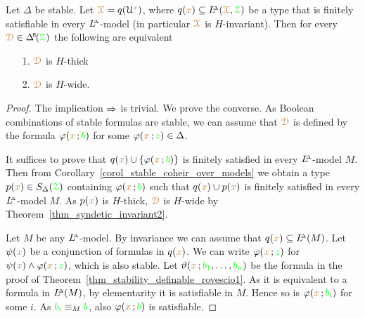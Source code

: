\begin{theorem}\label{thm_thick_finsat}
  Let $\Delta$ be stable.
  Let ${\color{brown}\EuScript X}=q(\EuScript U^{\color{brown} x})$, where $q({\color{brown} x})\subseteq L\kern-.5ex^{\scriptscriptstyle\Delta}({\color{brown}\EuScript X},{\color{green}\EuScript Z})$ be a type that is finitely satisfiable in every $L\kern-.5ex^{\scriptscriptstyle\Delta}$-model (in particular ${\color{brown}\EuScript X}$ is $H$-invariant).
  Then for every $\mrD\in\BDelta(\grZ)$ the following are equivalent 
  \begin{itemize}
    \item[1.] ${\color{brown}\EuScript D}$ is $H$-thick
    \item[2.] ${\color{brown}\EuScript D}$ is $H$-wide.
  \end{itemize}\smallskip
\end{theorem}
\begin{proof}
  The implication $\Rightarrow$ is trivial.
  We prove the converse.
  As Boolean combinations of stable formulas are stable, we can assume that ${\color{brown}\EuScript D}$ is defined by the formula $\varphi({\color{brown} x}\,;{\color{green} b})$ for some $\varphi({\color{brown} x}\,;{\color{green} z})\in\Delta$.

  It suffices to prove that $q({\color{brown} x})\cup\{\varphi({\color{brown} x}\,;{\color{green} b})\}$ is finitely satisfied in every $L\kern-.5ex^{\scriptscriptstyle\Delta}$-model $M$.
  Then from Corollary~\ref{corol_stable_coheir_over_models} we obtain a type $p({\color{brown} x})\in S_\Delta({\color{green}\EuScript Z})$ containing $\varphi({\color{brown} x}\,;{\color{green} b})$ such that $q({\color{brown} x})\cup p({\color{brown} x})$ is finitely  satisfied in every $L\kern-.5ex^{\scriptscriptstyle\Delta}$-model $M$. 
  As $p({\color{brown} x})$ is $H$-thick, ${\color{brown}\EuScript D}$ is $H$-wide by Theorem~\ref{thm_syndetic_invariant2}.
  
  Let $M$ be any  $L\kern-.5ex^{\scriptscriptstyle\Delta}$-model.
  By invariance we can assume that $q({\color{brown} x})\subseteq L\kern-.5ex^{\scriptscriptstyle\Delta}(M)$.
  Let $\psi({\color{brown} x})$ be a conjunction of formulas in $q({\color{brown} x})$.
  We can write $\varphi({\color{brown} x}\,;{\color{green} z})$ for $\psi({\color{brown} x})\wedge\varphi({\color{brown} x}\,;{\color{green} z})$, which is also stable.
  Let $\vartheta({\color{brown} x}\,;{\color{green} b_1},\dots,{\color{green} b_n})$ be the formula in the proof of Theorem~\ref{thm_stability_definable_rovescio1}.
  As it is equivalent to a formula in $L\kern-.5ex^{\scriptscriptstyle\Delta}(M)$, by elementarity it is satisfiable in $M$.
  Hence so is $\varphi({\color{brown} x}\,;{\color{green} b_i})$ for some $i$.
  As ${\color{green} b_i}\equiv_M{\color{green} b}$, also $\varphi({\color{brown} x}\,;{\color{green} b})$ is satisfiable.
\end{proof}

